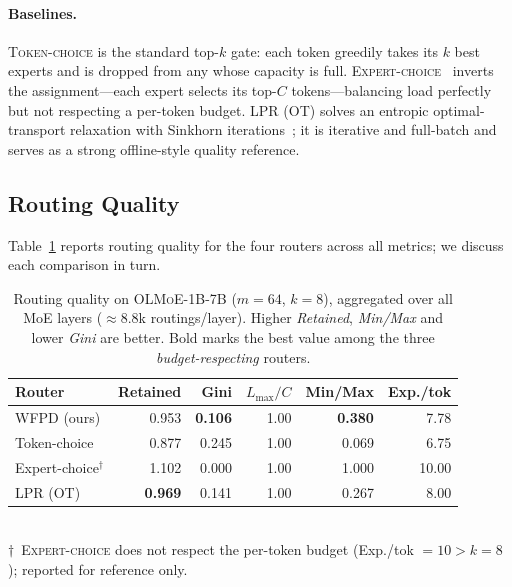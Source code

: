 \documentclass[preprint,12pt]{elsarticle}
\theoremstyle{plain}
\theoremstyle{remark}
\newcommand{\Lmax}{L_{\max}}
\begin{document}
\paragraph{Baselines.}
\textsc{Token-choice} is the standard top-$k$ gate: each token greedily
takes its $k$ best experts and is dropped from any whose capacity is full.
\textsc{Expert-choice}~\cite{expertchoice} inverts the assignment---each
expert selects its top-$C$ tokens---balancing load perfectly but not
respecting a per-token budget. \textsc{LPR (OT)} solves an entropic
optimal-transport relaxation with Sinkhorn iterations~\cite{sinkhorn}; it is
iterative and full-batch and serves as a strong offline-style quality
reference.

\subsection{Routing Quality}
\label{sec:exp-quality}

Table~\ref{tab:quality} reports routing quality for the four routers across
all metrics; we discuss each comparison in turn.

\begin{table}[t]
\centering
\caption{Routing quality on \textsc{OLMoE-1B-7B} ($m=64$, $k=8$),
aggregated over all MoE layers ($\approx 8.8$k routings/layer). Higher
\emph{Retained}, \emph{Min/Max} and lower \emph{Gini} are
better. Bold marks the best value among the three \emph{budget-respecting}
routers.}
\label{tab:quality}
\begin{tabular}{lrrrrr}
\toprule
Router & Retained & Gini & $\Lmax/C$ & Min/Max & Exp./tok \\
\midrule
WFPD (ours)               & 0.953          & \textbf{0.106} & 1.00 & \textbf{0.380} & 7.78 \\
Token-choice              & 0.877          & 0.245          & 1.00 & 0.069          & 6.75 \\
Expert-choice$^{\dagger}$ & 1.102          & 0.000          & 1.00 & 1.000          & 10.00 \\
LPR (OT)                  & \textbf{0.969} & 0.141          & 1.00 & 0.267          & 8.00 \\
\bottomrule
\end{tabular}
\\[3pt]
{\footnotesize $\dagger$~\textsc{Expert-choice} does not respect the
per-token budget (Exp./tok $=10>k=8$); reported for reference only.}
\end{table}
\end{document}
